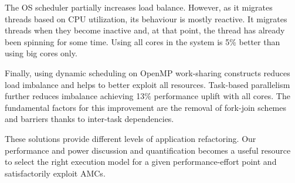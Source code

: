 The OS scheduler partially increases load balance. 
However, as it migrates threads based on CPU utilization, its behaviour is mostly reactive. 
It migrates threads when they become inactive and, at that point, the thread has already been spinning for some time. 
Using all cores in the system is 5\% better than using big cores only.

Finally, using dynamic scheduling on OpenMP work-sharing constructs reduces load imbalance and helps to better exploit all resources.
Task-based parallelism further reduces imbalance achieving 13\% performance uplift with all cores. 
The fundamental factors for this improvement are the removal of fork-join schemes and barriers
thanks to inter-task dependencies.

These solutions provide different levels of application refactoring. 
Our performance and power discussion and quantification becomes a useful resource to select the right execution model for a given performance-effort point and satisfactorily exploit AMCs. 
\fi

